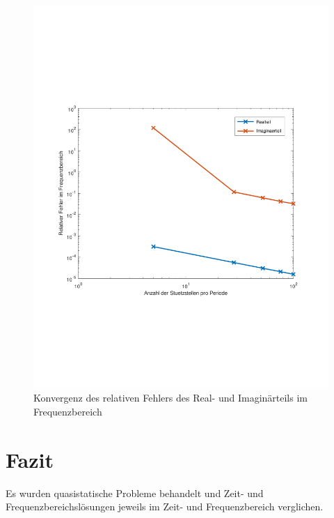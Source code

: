 \documentclass[Protokollheft.tex]{subfiles}
\begin{document}
\begin{figure}[h]
	\centering
	\includegraphics[trim = 15mm 65mm 15mm 65mm, clip,width=0.7\linewidth]{Konvergenz_freq.pdf}
	\caption{Konvergenz des relativen Fehlers des Real- und Imaginärteils im Frequenzbereich}
	\label{fig:Konvergenz_freq}
\end{figure}




\section{Fazit}
Es wurden quasistatische Probleme behandelt und Zeit- und Frequenzbereichslösungen jeweils im Zeit- und Frequenzbereich verglichen. 
\end{document}
